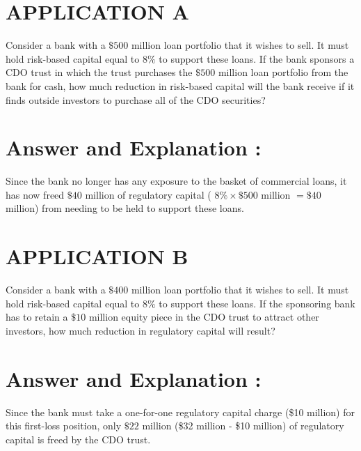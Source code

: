 \documentclass[11pt]{article}
\begin{document}
\section*{APPLICATION A}
Consider a bank with a $\$ 500$ million loan portfolio that it wishes to sell. It must hold risk-based capital equal to $8 \%$ to support these loans. If the bank sponsors a CDO trust in which the trust purchases the $\$ 500$ million loan portfolio from the bank for cash, how much reduction in risk-based capital will the bank receive if it finds outside investors to purchase all of the CDO securities?

\section*{Answer and Explanation :}
Since the bank no longer has any exposure to the basket of commercial loans, it has now freed $\$ 40$ million of regulatory capital ( $8 \% \times \$ 500$ million $=\$ 40$ million) from needing to be held to support these loans.

\section*{APPLICATION B}
Consider a bank with a $\$ 400$ million loan portfolio that it wishes to sell. It must hold risk-based capital equal to $8 \%$ to support these loans. If the sponsoring bank has to retain a $\$ 10$ million equity piece in the CDO trust to attract other investors, how much reduction in regulatory capital will result?

\section*{Answer and Explanation :}
Since the bank must take a one-for-one regulatory capital charge (\$10 million) for this first-loss position, only $\$ 22$ million (\$32 million - \$10 million) of regulatory capital is freed by the CDO trust.
\end{document}
